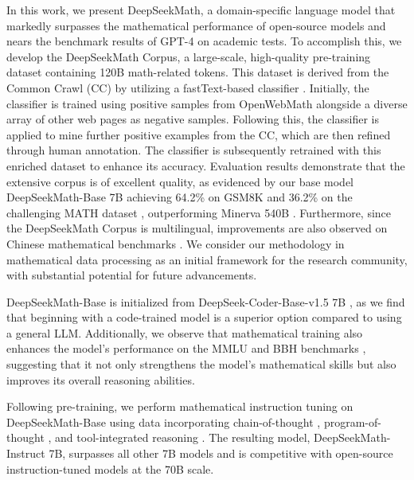 In this work, we present DeepSeekMath, a domain-specific language model that markedly surpasses the mathematical performance of open-source models and nears the benchmark results of GPT-4 on academic tests. To accomplish this, we develop the DeepSeekMath Corpus, a large-scale, high-quality pre-training dataset containing 120B math-related tokens. This dataset is derived from the Common Crawl (CC) by utilizing a fastText-based classifier \citep{joulin2016fasttext}. Initially, the classifier is trained using positive samples from OpenWebMath \citep{openwebmath} alongside a diverse array of other web pages as negative samples. Following this, the classifier is applied to mine further positive examples from the CC, which are then refined through human annotation. The classifier is subsequently retrained with this enriched dataset to enhance its accuracy. Evaluation results demonstrate that the extensive corpus is of excellent quality, as evidenced by our base model DeepSeekMath-Base 7B achieving 64.2\% on GSM8K \citep{gsm8k} and 36.2\% on the challenging MATH dataset \citep{MATH}, outperforming Minerva 540B \citep{minerva}. Furthermore, since the DeepSeekMath Corpus is multilingual, improvements are also observed on Chinese mathematical benchmarks \citep{wei2023cmath,agieval}. We consider our methodology in mathematical data processing as an initial framework for the research community, with substantial potential for future advancements.

DeepSeekMath-Base is initialized from DeepSeek-Coder-Base-v1.5 7B \citep{deepseek-coder}, as we find that beginning with a code-trained model is a superior option compared to using a general LLM. Additionally, we observe that mathematical training also enhances the model’s performance on the MMLU \citep{mmlu} and BBH benchmarks \citep{bbh}, suggesting that it not only strengthens the model’s mathematical skills but also improves its overall reasoning abilities.

Following pre-training, we perform mathematical instruction tuning on DeepSeekMath-Base using data incorporating chain-of-thought \citep{cot}, program-of-thought \citep{pot,pal}, and tool-integrated reasoning \citep{tora}. The resulting model, DeepSeekMath-Instruct 7B, surpasses all other 7B models and is competitive with open-source instruction-tuned models at the 70B scale.

